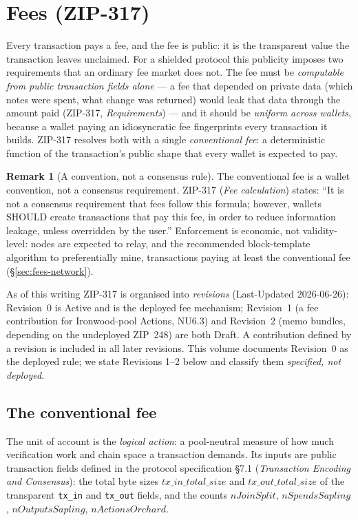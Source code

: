 \documentclass[11pt,a4paper]{article}
\theoremstyle{definition}
\newtheorem{remark}[theorem]{Remark}
\begin{document}
\section{Fees (ZIP-317)}\label{sec:fees}

Every transaction pays a fee, and the fee is public: it is the transparent
value the transaction leaves unclaimed. For a shielded protocol this
publicity imposes two requirements that an ordinary fee market does not. The
fee must be \emph{computable from public transaction fields alone} --- a fee
that depended on private data (which notes were spent, what change was
returned) would leak that data through the amount paid (ZIP-317,
\emph{Requirements}) --- and it should be \emph{uniform across wallets},
because a wallet paying an idiosyncratic fee fingerprints every transaction
it builds. ZIP-317 resolves both with a single \emph{conventional fee}: a
deterministic function of the transaction's public shape that every wallet
is expected to pay.

\begin{remark}[A convention, not a consensus rule]\label{rem:fee-convention}
The conventional fee is a wallet convention, not a consensus requirement.
ZIP-317 (\emph{Fee calculation}) states: ``It is not a consensus requirement
that fees follow this formula; however, wallets SHOULD create transactions
that pay this fee, in order to reduce information leakage, unless overridden
by the user.'' Enforcement is economic, not validity-level: nodes are
expected to relay, and the recommended block-template algorithm to
preferentially mine, transactions paying at least the conventional fee
(\S\ref{sec:fees-network}).
\end{remark}

As of this writing ZIP-317 is organised into \emph{revisions}
(Last-Updated 2026-06-26): Revision~0 is Active and is the deployed fee
mechanism; Revision~1 (a fee contribution for Ironwood-pool Actions, NU6.3)
and Revision~2 (memo bundles, depending on the undeployed ZIP~248) are both
Draft. A contribution defined by a revision is included in all later
revisions. This volume documents Revision~0 as the deployed rule; we state
Revisions 1--2 below and classify them \emph{specified, not deployed}.

\subsection{The conventional fee}\label{sec:fees-conventional}

The unit of account is the \emph{logical action}: a pool-neutral measure of
how much verification work and chain space a transaction demands. Its inputs
are public transaction fields defined in the protocol specification
\S7.1 (\emph{Transaction Encoding and Consensus}): the total byte sizes
$\mathit{tx\_in\_total\_size}$ and $\mathit{tx\_out\_total\_size}$ of the
transparent \texttt{tx\_in} and \texttt{tx\_out} fields, and the counts
$\mathit{nJoinSplit}$, $\mathit{nSpendsSapling}$,
$\mathit{nOutputsSapling}$, $\mathit{nActionsOrchard}$.
\end{document}
